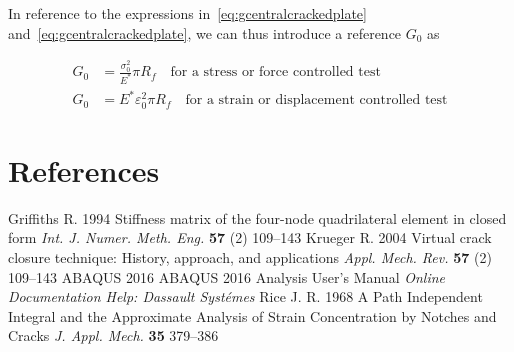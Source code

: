 \documentclass[a4paper]{jpconf}
\begin{document}
In reference to the expressions in~\ref{eq:gcentralcrackedplate} and~\ref{eq:gcentralcrackedplate}, we can thus introduce a reference $G_{0}$ as

\begin{equation}
\begin{split}
G_{0}&=\frac{\sigma_{0}^{2}}{E^{*}}\pi R_{f}\quad\text{for a stress or force controlled test}\\[5pt]
G_{0}&=E^{*}\varepsilon_{0}^{2}\pi R_{f}\quad\text{for a strain or displacement controlled test}
\end{split}
\end{equation}





\section*{References}
\begin{thebibliography}{9}
Griffiths  R. 1994 Stiffness matrix of the four-node quadrilateral element in closed form {\it Int. J. Numer. Meth. Eng.} {\bf 57} (2) 109--143
Krueger R. 2004 Virtual crack closure technique: History, approach, and applications {\it Appl. Mech. Rev.} {\bf 57} (2) 109--143
 ABAQUS 2016 ABAQUS 2016 Analysis User's Manual {\it Online Documentation Help: Dassault Syst\'emes}
Rice J. R. 1968 A Path Independent Integral and the Approximate Analysis of Strain Concentration by Notches and Cracks {\it J. Appl. Mech.} {\bf 35} 379--386

\end{thebibliography}
\end{document}

